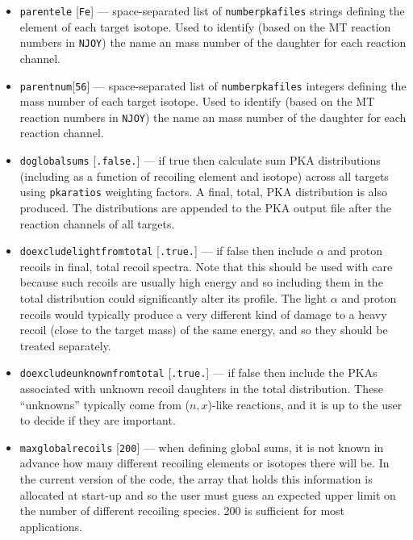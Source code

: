 \documentclass[a4paper]{article}
\begin{document}
\begin{itemize}
\item \texttt{parent{\textunderscore}ele} [\texttt{Fe}] --- space-separated list of \texttt{number{\textunderscore}pka{\textunderscore}files} strings defining the element of each target isotope. Used to identify (based on the MT reaction numbers in \texttt{NJOY}) the name an mass number of the daughter for each reaction channel.
\item \texttt{parent{\textunderscore}num}[\texttt{56}] --- space-separated list of \texttt{number{\textunderscore}pka{\textunderscore}files} integers defining the mass number of each target isotope. Used to identify (based on the MT reaction numbers in \texttt{NJOY}) the name an mass number of the daughter for each reaction channel.
\item \texttt{do{\textunderscore}global{\textunderscore}sums} [\texttt{.false.}] --- if true then calculate sum PKA distributions (including as a function of recoiling element and isotope) across all targets using \texttt{pka{\textunderscore}ratios} weighting factors. A final, total, PKA distribution is also produced. The distributions are appended to the PKA output file after the reaction channels of all targets.
\item \texttt{do{\textunderscore}exclude{\textunderscore}light{\textunderscore}from{\textunderscore}total} [\texttt{.true.}] --- if false then include \(\alpha\) and proton recoils in final, total recoil spectra. Note that this should be used with care because such recoils are usually high energy and so including them in the total distribution could significantly alter its profile. The light \(\alpha\) and proton recoils would typically produce a very different kind of damage to a heavy recoil (close to the target mass) of the same energy, and so they should be treated separately.
\item \texttt{do{\textunderscore}exclude{\textunderscore}unknown{\textunderscore}from{\textunderscore}total} [\texttt{.true.}] --- if false then include the PKAs associated with unknown recoil daughters in the total distribution. These ``unknowns'' typically come from (\(n,x\))-like reactions, and it is up to the user to decide if they are important.
\item \texttt{max{\textunderscore}global{\textunderscore}recoils} [\texttt{200}] --- when defining global sums, it is not known in advance how many different recoiling elements or isotopes there will be. In the current version of the code, the array that holds this information is allocated at start-up and so the user must guess an expected upper limit on the number of different recoiling species. 200 is sufficient for most applications.


\end{itemize}
\end{document}
